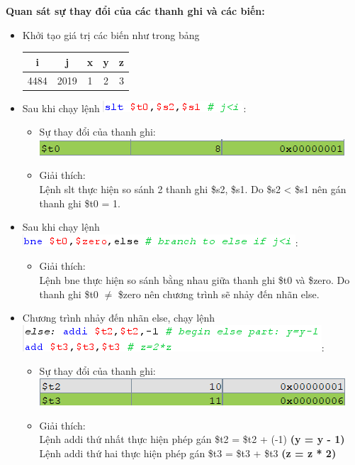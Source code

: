 \documentclass[12pt,a4paper,oneside]{article}
\begin{document}
\noindent \textbf{Quan sát sự thay đổi của các thanh ghi và các biến:}
\begin{itemize}
\item Khởi tạo giá trị các biến như trong bảng
\begin{center}
\begin{tabular}{|c|c|c|c|c|}
\hline 
i & j & x & y & z \\ 
\hline 
4484 & 2019 & 1 & 2 & 3 \\ 
\hline 
\end{tabular}
\end{center}
\item Sau khi chạy lệnh \quad \includegraphics[scale=1]{image/1.1}:\\
\begin{itemize}
\item Sự thay đổi của thanh ghi: \includegraphics[scale=1]{image/1.2}
\item Giải thích:\\
Lệnh slt thực hiện so sánh 2 thanh ghi \$s2, \$s1. Do \$s2 < \$s1 nên gán thanh ghi \$t0 = 1.
\end{itemize}


\item Sau khi chạy lệnh  \quad \includegraphics[scale=1]{image/1.3}:\\
\begin{itemize}
\item Giải thích:\\
Lệnh bne thực hiện so sánh bằng nhau giữa thanh ghi \$t0 và \$zero. Do thanh ghi \$t0 
$ \neq $ \$zero nên chương trình sẽ nhảy đến nhãn else.
\end{itemize}

\item Chương trình nhảy đến nhãn else, chạy lệnh \quad \includegraphics[scale=1]{image/1.4}:\\
\begin{itemize}
\item Sự thay đổi của thanh ghi: \includegraphics[scale=1]{image/1.5}
\item Giải thích:\\
Lệnh addi thứ nhất thực hiện phép gán \$t2 = \$t2 + (-1) \quad \textbf{(y = y - 1)}\\
Lệnh addi thứ hai thực hiện phép gán \$t3 = \$t3 + \$t3 \quad \textbf{(z = z * 2)}
\end{itemize}
\end{itemize}
\pagebreak
\end{document}
